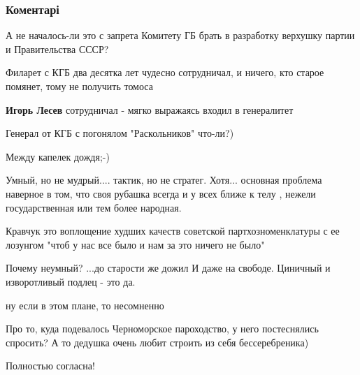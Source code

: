  
 
 
 
 
\subsubsection{Коментарі}

\begin{itemize} %
А не началось-ли это с запрета Комитету ГБ брать в разработку верхушку партии и Правительства СССР?

\begin{itemize} %
Филарет с КГБ два десятка лет чудесно сотрудничал, и ничего, кто старое помянет, тому не получить томоса

\textbf{Игорь Лесев} сотрудничал - мягко выражаясь входил в генералитет

Генерал от КГБ с погонялом "Раскольников" что-ли?)
\end{itemize} %

Между капелек дождя;-)


Умный, но не мудрый.... тактик, но не стратег. Хотя... основная проблема наверное
в том, что своя рубашка всегда и у всех ближе к телу , нежели государственная
или тем более народная.


Кравчук это воплощение худших качеств советской партхозноменклатуры с ее лозунгом "чтоб у нас все было и нам за это ничего не было"

Почему неумный?
...до старости же дожил
И даже на свободе.
Циничный и изворотливый подлец - это да.

\begin{itemize} %
ну если в этом плане, то несомненно
\end{itemize} %

Про то, куда подевалось Черноморское пароходство, у него постеснялись спросить? А то дедушка очень любит строить из себя бессеребреника)

Полностью согласна!


\end{itemize}
